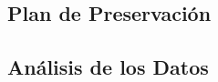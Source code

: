 \documentclass[12pt, spanish]{article}
\begin{document}
\subsection{Plan de Preservación}

\subsection{Análisis de los Datos}




































\end{document}
